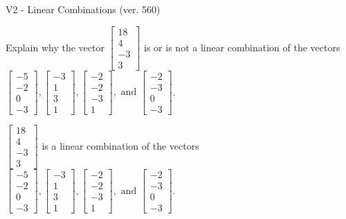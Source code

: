 \begin{exercise}
  \begin{exerciseTitle}V2 - Linear Combinations (ver. 560)\end{exerciseTitle}
  \begin{exerciseStatement}
    Explain why the vector \(\left[\begin{array}{c}
18 \\
4 \\
-3 \\
3
\end{array}\right]\)  is or is not a linear 
	combination of the vectors \(\left[\begin{array}{c}
-5 \\
-2 \\
0 \\
-3
\end{array}\right] , \left[\begin{array}{c}
-3 \\
1 \\
3 \\
1
\end{array}\right] , \left[\begin{array}{c}
-2 \\
-2 \\
-3 \\
1
\end{array}\right] , \text{ and } \left[\begin{array}{c}
-2 \\
-3 \\
0 \\
-3
\end{array}\right]\).
	


  \end{exerciseStatement}
  \begin{exerciseAnswer}
   \(\left[\begin{array}{c}
18 \\
4 \\
-3 \\
3
\end{array}\right]\) 
  	 is  
	a linear combination of the vectors \(\left[\begin{array}{c}
-5 \\
-2 \\
0 \\
-3
\end{array}\right] , \left[\begin{array}{c}
-3 \\
1 \\
3 \\
1
\end{array}\right] , \left[\begin{array}{c}
-2 \\
-2 \\
-3 \\
1
\end{array}\right] , \text{ and } \left[\begin{array}{c}
-2 \\
-3 \\
0 \\
-3
\end{array}\right]\).


\end{exerciseAnswer}
\end{exercise}

